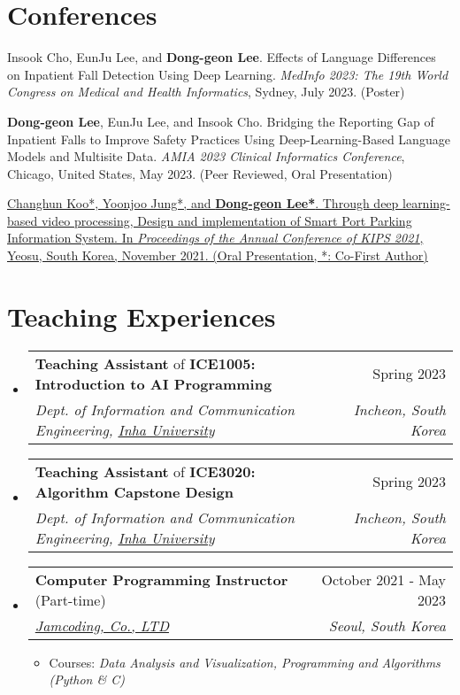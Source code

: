 \documentclass[letterpaper,11pt]{article}
\makeatletter
\newcommand{\resumeSubheading}[4]{
  \vspace{-1pt}\item
    \begin{tabular*}{0.97\textwidth}{l@{\extracolsep{\fill}}r}
      #1 & #2 \\
      \textit{\small#3} & \textit{\small #4} \\
    \end{tabular*}\vspace{-5pt}
}
\makeatother
\begin{document}
    \section{Conferences}
    \begin{enumerate}[noitemsep, leftmargin=*,label={[\arabic*]}]
        \item {Insook Cho, EunJu Lee, and \textbf{Dong-geon Lee}. Effects of Language Differences on Inpatient Fall Detection Using Deep Learning. \textit{MedInfo 2023: The 19th World Congress on Medical and Health Informatics}, Sydney, July 2023. (Poster)}
        
        \item {\textbf{Dong-geon Lee}, EunJu Lee, and Insook Cho. Bridging the Reporting Gap of Inpatient Falls to Improve Safety Practices Using Deep-Learning-Based Language Models and Multisite Data. \textit{AMIA 2023 Clinical Informatics Conference}, Chicago, United States, May 2023. (Peer Reviewed, Oral Presentation)}
        
        \item {\href{https://doi.org/10.3745/PKIPS.y2021m11a.1342}{Changhun Koo*, Yoonjoo Jung*, and \textbf{Dong-geon Lee*}. Through deep learning-based video processing, Design and implementation of Smart Port Parking Information System. In \textit{Proceedings of the Annual Conference of KIPS 2021}, Yeosu, South Korea, November 2021. (Oral Presentation, *: Co-First Author)}}
    \end{enumerate}
    
    \section{Teaching Experiences}
    \begin{itemize}[leftmargin=*,label=]
        \resumeSubheading
        {\textbf{Teaching Assistant} of \textbf{ICE1005: Introduction to AI Programming}}{Spring 2023}
            {Dept. of Information and Communication Engineering, \href{https://eng.inha.ac.kr/eng/index.do}{Inha University}}{Incheon, South Korea}
        \resumeSubheading
        {\textbf{Teaching Assistant} of \textbf{ICE3020: Algorithm Capstone Design}}{Spring 2023}
            {Dept. of Information and Communication Engineering, \href{https://eng.inha.ac.kr/eng/index.do}{Inha University}}{Incheon, South Korea}           
        \resumeSubheading
        {\textbf{Computer Programming Instructor} (Part-time)}{October 2021 - May 2023}
            {\href{https://jamcoding.co.kr/}{Jamcoding, Co., LTD}}{Seoul, South Korea}
            \begin{itemize}[label=\bullet]
                \item{Courses: \textit{Data Analysis and Visualization, Programming and Algorithms (Python \& C)}}
            \end{itemize}
    \end{itemize}
\end{document}
